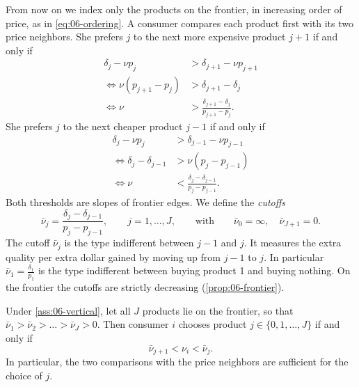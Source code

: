 From now on we index only the products on the frontier, in increasing order of price, as in
\eqref{eq:06-ordering}. A consumer compares each product first with its two price neighbors. She prefers
$j$ to the next more expensive product $j+1$ if and only if
\begin{align*}
  \delta_j - \nu p_j &> \delta_{j+1} - \nu p_{j+1}\\
  \iff \nu(p_{j+1} - p_j) &> \delta_{j+1} - \delta_j\\
  \iff \nu &> \frac{\delta_{j+1} - \delta_j}{p_{j+1} - p_j}.
\end{align*}
She prefers $j$ to the next cheaper product $j-1$ if and only if
\begin{align*}
  \delta_j - \nu p_j &> \delta_{j-1} - \nu p_{j-1}\\
  \iff \delta_j - \delta_{j-1} &> \nu(p_j - p_{j-1})\\
  \iff \nu &< \frac{\delta_j - \delta_{j-1}}{p_j - p_{j-1}}.
\end{align*}
Both thresholds are slopes of frontier edges. We define the \emph{cutoffs}
\begin{equation}\label{eq:06-cutoff}
  \bar\nu_j = \frac{\delta_j - \delta_{j-1}}{p_j - p_{j-1}}, \qquad j = 1, \dots, J,
  \qquad\text{with}\qquad \bar\nu_0 = \infty, \quad \bar\nu_{J+1} = 0 .
\end{equation}
The cutoff $\bar\nu_j$ is the type indifferent between $j-1$ and $j$. It measures the extra quality per
extra dollar gained by moving up from $j-1$ to $j$. In particular $\bar\nu_1 = \frac{\delta_1}{p_1}$ is the
type indifferent between buying product 1 and buying nothing. On the frontier the cutoffs are strictly
decreasing (\cref{prop:06-frontier}).

\begin{proposition}\label{prop:06-cutoffs}
Under \cref{ass:06-vertical}, let all $J$ products lie on the frontier, so that
$\bar\nu_1 > \bar\nu_2 > \dots > \bar\nu_J > 0$. Then consumer $i$ chooses product $j \in \{0, 1, \dots, J\}$
if and only if
\begin{equation}\label{eq:06-choice-interval}
  \bar\nu_{j+1} < \nu_i < \bar\nu_j .
\end{equation}
In particular, the two comparisons with the price neighbors are sufficient for the choice of $j$.
\end{proposition}

